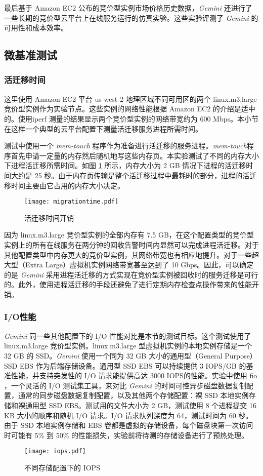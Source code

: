 最后基于 Amazon EC2 公布的竞价型实例市场价格历史数据，\emph{Gemini} 还进行了一些长期的竞价型云平台上在线服务运行的仿真实验。这些实验评测了 \emph{Gemini} 的可用性和成本效率。

\subsection{微基准测试}

\subsubsection{活迁移时间}
\label{gemini-migrationtime}
这里使用 Amazon EC2 平台 us-west-2 地理区域不同可用区的两个 linux.m3.large 竞价型实例作为实验节点。这些实例的网络性能根据 Amazon EC2 的介绍是适中的。使用iperf \cite{Iperf:2014} 测量的结果显示两个竞价型实例的网络带宽约为 600 Mbps。本小节在这样一个典型的云平台配置下测量活迁移服务进程所需时间。

测试中使用一个 \emph{mem-touch} 程序作为准备进行活迁移的服务进程。\emph{mem-touch}程序首先申请一定量的内存然后随机地写这些内存页。本实验测试了不同的内存大小下进程活迁移所需时间。如图 \ref{figure:migrationtime} 所示，内存大小为 2 GB 情况下进程的活迁移时间大约是 25 秒。由于内存页传输是整个活迁移过程中最耗时的部分，进程的活迁移时间主要由它占用的内存大小决定。
\begin{figure}
  \centering
  \texttt{[image: migrationtime.pdf]}
  \caption{活迁移时间开销}
  \label{figure:migrationtime}
\end{figure}

因为 linux.m3.large 竞价型实例的全部内存有 7.5 GB，在这个配置类型的竞价型实例上的所有在线服务在两分钟的回收告警时间内显然可以完成进程活迁移。对于其他配置类型中内存更大的竞价型实例，其网络带宽也有相应地提升。对于一些超大型（Extra Large）虚拟机实例网络带宽甚至达到了 10 Gbps。因此，可以确定的是 \emph{Gemini} 采用进程活迁移的方式实现在竞价型实例被回收时的服务迁移是可行的。此外，使用进程活迁移的手段还避免了进行定期内存检查点操作带来的性能开销。

\subsubsection{I/O性能}
\emph{Gemini} 同一些其他配置下的 I/O 性能对比是本节的测试目标。这个测试使用了 linux.m3.large 竞价型实例。linux.m3.large 型虚拟机实例的本地实例存储是一个 32 GB 的 SSD。\emph{Gemini} 使用一个同为 32 GB 大小的通用型（General Purpose）SSD EBS 作为后端存储设备。通用型 SSD EBS 可以持续提供 3 IOPS/GB 的基准性能，并支持突发性的 I/O 请求能提供高达 3000 IOPS的性能。实验中使用 fio \cite{FIO:2014}，一个灵活的 I/O 测试集工具，来对比 \emph{Gemini} 的时间可控异步磁盘数据复制配置，通常的同步磁盘数据复制配置，以及其他两个存储配置：裸 SSD 本地实例存储和裸通用型 SSD EBS。测试用的文件大小为 2 GB，测试使用 8 个进程提交 16 KB 大小的顺序和随机 I/O 请求。I/O 请求队列深度为 64，测试时间为 60 秒。由于 SSD 本地实例存储和 EBS 卷都是虚拟的存储设备，每个磁盘块第一次访问时可能有 5\% 到 50\% 的性能损失，实验前将待测的存储设备进行了预热处理。
\begin{figure}[]
  \centering
  \texttt{[image: iops.pdf]}
  \caption{不同存储配置下的 IOPS}
  \label{figure:iops}
\end{figure}

